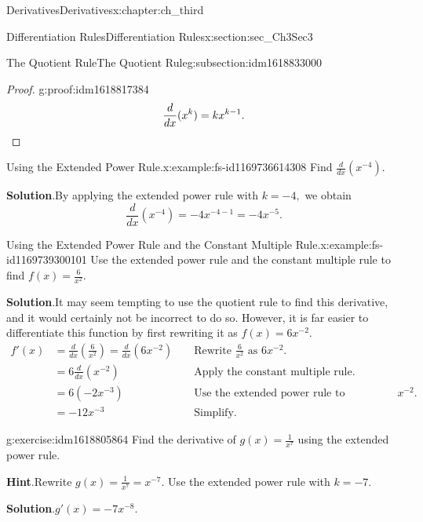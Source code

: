 \documentclass[oneside,10pt,]{book}
\newcommand{\blocktitlefont}{\relax}
\numberwithin{equation}{section}
\newcommand{\qedhere}{\relax}
\newcommand{\amp}{&}
\begin{document}
\begin{chapterptx}{Derivatives}{}{Derivatives}{}{}{x:chapter:ch_third}
\begin{sectionptx}{Differentiation Rules}{}{Differentiation Rules}{}{}{x:section:sec_Ch3Sec3}
\begin{subsectionptx}{The Quotient Rule}{}{The Quotient Rule}{}{}{g:subsection:idm1618833000}
\begin{proof}{}{g:proof:idm1618817384}
%
\begin{equation*}
\frac{d}{dx}(x^k)=kx^{k-1} .\qedhere
\end{equation*}
\end{proof}
\begin{example}{Using the Extended Power Rule.}{x:example:fs-id1169736614308}%
Find \(\frac{d}{dx}(x^{-4}).\)%
\par\smallskip%
\noindent\textbf{\blocktitlefont Solution}.\hypertarget{g:solution:idm1618808680}{}\quad{}By applying the extended power rule with \(k=-4,\) we obtain%
%
\begin{equation*}
\frac{d}{dx}(x^{-4})=-4x^{-4-1}=-4x^{-5}.
\end{equation*}
\end{example}
\begin{example}{Using the Extended Power Rule and the Constant Multiple Rule.}{x:example:fs-id1169739300101}%
Use the extended power rule and the constant multiple rule to find \(f(x)=\frac{6}{x^2}.\)%
\par\smallskip%
\noindent\textbf{\blocktitlefont Solution}.\hypertarget{g:solution:idm1618806248}{}\quad{}It may seem tempting to use the quotient rule to find this derivative, and it would certainly not be incorrect to do so. However, it is far easier to differentiate this function by first rewriting it as \(f(x)=6x^{-2}.\)%
%
\begin{align*}
f'(x)\amp=\frac{d}{dx}(\frac{6}{x^2})=\frac{d}{dx}(6x^{-2})\amp\amp \text{ Rewrite } \frac{6}{x^2} \text{ as } 6x^{-2}.\\
\amp=6\frac{d}{dx}(x^{-2})\amp \amp \text{ Apply the constant multiple rule. }\\
\amp=6(-2x^{-3})\amp \amp \text{ Use the extended power rule to differentiate } x^{-2}.\\
\amp=-12x^{-3}\amp \amp \text{ Simplify. }
\end{align*}
\end{example}
\begin{inlineexercise}{}{g:exercise:idm1618805864}%
Find the derivative of \(g(x)=\frac{1}{x^7}\) using the extended power rule.%
\par\smallskip%
\noindent\textbf{\blocktitlefont Hint}.\hypertarget{g:hint:idm1618802664}{}\quad{}Rewrite \(g(x)=\frac{1}{x^7}=x^{-7}.\) Use the extended power rule with \(k=-7.\)%
\par\smallskip%
\noindent\textbf{\blocktitlefont Solution}.\hypertarget{g:solution:idm1618801896}{}\quad{}\(g'(x)=-7x^{-8}.\)%
\end{inlineexercise}%

\end{subsectionptx}
\end{sectionptx}
\end{chapterptx}
\end{document}
